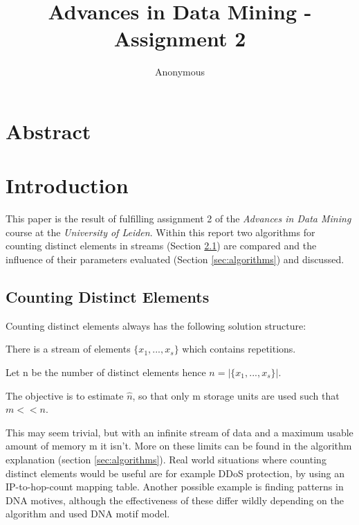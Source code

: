 \documentclass{article}[]
\begin{document}
	\title{Advances in Data Mining - Assignment 2}
	\author{Anonymous}
	\maketitle
	\lstset{
		basicstyle=\ttfamily,
		keywordstyle=\bfseries,
		language=Java,
		frame=single,
		aboveskip=11pt,
		belowskip=11pt,
		breaklines=true,
		breakatwhitespace=false,
		showspaces=false,
		showstringspaces=false,
		numbers=left,
		stepnumber=1,    
		firstnumber=1,
		numberfirstline=true
	}

\section{Abstract}
\section{Introduction}
This paper is the result of fulfilling assignment 2 of the \emph{Advances in Data Mining} course at the \emph{University of Leiden}.
Within this report two algorithms for counting distinct elements in streams (Section \ref{sec:counting}) are compared and the influence of their parameters evaluated (Section \ref{sec:algorithms}) and discussed.

\subsection{Counting Distinct Elements}
\label{sec:counting}
Counting distinct elements always has the following solution structure:

There is a stream of elements $\{x_1,...,x_s\}$ which contains repetitions.

Let n be the number of distinct elements hence $n=|\{x_1,...,x_s\}|$.

The objective is to estimate $\hat{n}$, so that only m storage units are used such that $m << n$.

This may seem trivial, but with an infinite stream of data and a maximum usable amount of memory m it isn't.
More on these limits can be found in the algorithm explanation (section \ref{sec:algorithms}).
Real world situations where counting distinct elements would be useful are for example DDoS protection\cite{wang2007defense}, by using an IP-to-hop-count mapping table.
Another possible example is finding patterns in DNA motives, although the effectiveness of these differ wildly depending on the algorithm and used DNA motif model\cite{das2007survey}.
\end{document}

